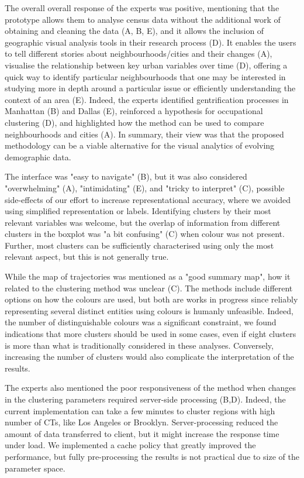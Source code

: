 The overall overall response of the experts was positive,  mentioning that the
prototype allows them to analyse census data without the additional work of
obtaining and cleaning the data (A, B, E), and it allows the inclusion of
geographic visual analysis tools in their research process (D). It enables the
users to tell different stories about neighbourhoods/cities and their changes
(A), visualise the relationship between key urban variables over time (D),
offering a quick way to identify particular neighbourhoods that one may be
interested in studying more in depth around a particular issue or efficiently
understanding the context of an area (E).  Indeed, the experts identified
gentrification processes in Manhattan (B) and Dallas (E), reinforced a
hypothesis for occupational clustering (D), and highlighted how the method can
be used to compare neighbourhoods and cities (A). In summary, their view was that
the proposed methodology can be a viable alternative for the visual analytics of
evolving demographic data.



The interface was "easy to navigate" (B), but it was also considered
"overwhelming" (A), "intimidating" (E), and "tricky to interpret" (C), possible
side-effects of our effort to increase  representational accuracy, where we
avoided using simplified representation or labels. Identifying clusters by their
most relevant variables was welcome, but the overlap of information from
different clusters in the boxplot was "a bit confusing" (C) when colour was not
present. Further, most clusters can be sufficiently characterised using only the
most relevant aspect, but this is not generally true. 


While the map of trajectories was mentioned as a "good summary map", how it
related to the clustering method was unclear (C). The methods include different
options on how the colours are used, but both are works in progress since reliably
representing several distinct entities using colours is humanly unfeasible.
Indeed, the number of distinguishable colours was a significant constraint, we
found indications that more clusters should be used in some cases, even if eight
clusters is more than what is traditionally considered in these analyses.
Conversely, increasing the number of clusters would also complicate the
interpretation of the results.


The experts also mentioned the poor responsiveness of the method when changes in
the clustering parameters required server-side processing (B,D). Indeed, the
current implementation can take a few minutes to cluster regions with high
number of CTs, like Los Angeles or Brooklyn. Server-processing reduced the
amount of data transferred to client, but it might increase the response time
under load. We implemented a cache policy that greatly improved the performance,
but fully pre-processing the results is not practical due to size of the
parameter space.

